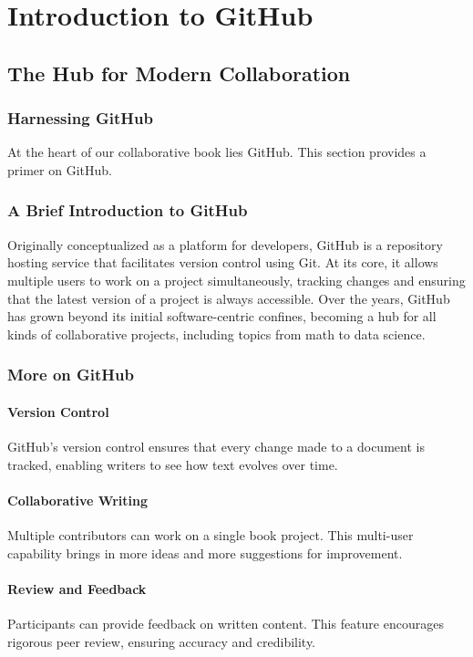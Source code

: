 \documentclass{book}
\begin{document}
\chapter{Introduction to GitHub}
\section*{The Hub for Modern Collaboration}
\subsection*{Harnessing GitHub}
At the heart of our collaborative book lies GitHub. This section provides a primer on GitHub.

\subsection*{A Brief Introduction to GitHub}
Originally conceptualized as a platform for developers, GitHub is a repository hosting service that facilitates version control using Git. At its core, it allows multiple users to work on a project simultaneously, tracking changes and ensuring that the latest version of a project is always accessible. Over the years, GitHub has grown beyond its initial software-centric confines, becoming a hub for all kinds of collaborative projects, including topics from math to data science.

\subsection*{More on GitHub}
\subsubsection*{Version Control}
GitHub's version control ensures that every change made to a document is tracked, enabling writers to see how text evolves over time.

\subsubsection*{Collaborative Writing}
Multiple contributors can work on a single book project. This multi-user capability brings in more ideas and more suggestions for improvement.

\subsubsection*{Review and Feedback}
Participants can provide feedback on written content. This feature encourages rigorous peer review, ensuring accuracy and credibility.
\end{document}
